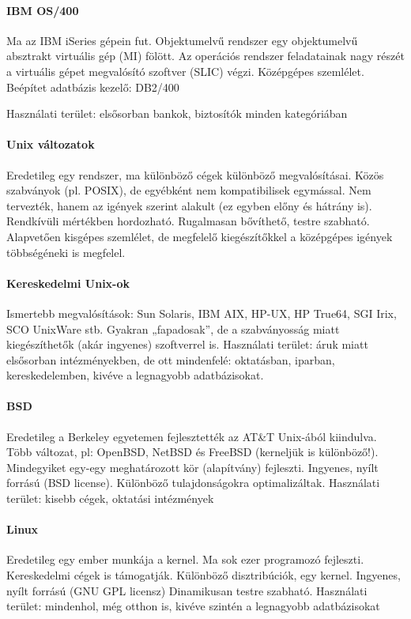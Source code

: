 \documentclass[fleqn,10pt,a4paper]{article}
\theoremstyle{magyar}
\begin{document}
  \paragraph{IBM OS/400}
  Ma az IBM iSeries gépein fut. Objektumelvű rendszer egy objektumelvű absztrakt virtuális gép (MI) fölött.
  Az operációs rendszer feladatainak nagy részét a virtuális gépet megvalósító szoftver (SLIC) végzi. Középgépes
  szemlélet. Beépítet adatbázis kezelő: DB2/400

  Használati terület: elsősorban bankok, biztosítók minden kategóriában

  \paragraph{Unix változatok} Eredetileg egy rendszer, ma különböző cégek különböző megvalósításai. Közös szabványok
  (pl. POSIX), de egyébként nem kompatibilisek egymással. Nem tervezték, hanem az igények szerint alakult (ez egyben
  előny és hátrány is). Rendkívüli mértékben hordozható. Rugalmasan bővíthető, testre szabható. Alapvetően kisgépes
  szemlélet, de megfelelő kiegészítőkkel a középgépes igények többségéneki is megfelel.

  \paragraph{Kereskedelmi Unix-ok} Ismertebb megvalósítások: Sun Solaris, IBM AIX, HP-UX, HP True64, SGI Irix, SCO
  UnixWare stb. Gyakran „fapadosak”, de a szabványosság miatt kiegészíthetők (akár ingyenes) szoftverrel is.
  Használati terület: áruk miatt elsősorban intézményekben, de ott mindenfelé: oktatásban, iparban, kereskedelemben,
  kivéve a legnagyobb adatbázisokat.

  \paragraph{BSD} Eredetileg a Berkeley egyetemen fejlesztették az AT\&T Unix-ából kiindulva. Több változat, pl:
  OpenBSD, NetBSD és FreeBSD (kerneljük is különböző!). Mindegyiket egy-egy meghatározott kör (alapítvány)
  fejleszti. Ingyenes, nyílt forrású (BSD license). Különböző tulajdonságokra optimalizáltak. Használati terület: kisebb
  cégek, oktatási intézmények

  \paragraph{Linux} Eredetileg egy ember munkája a kernel. Ma sok ezer programozó fejleszti. Kereskedelmi cégek is
  támogatják. Különböző disztribúciók, egy kernel. Ingyenes, nyílt forrású (GNU GPL licensz) 
  Dinamikusan testre szabható. Használati terület: mindenhol, még otthon is, kivéve szintén a legnagyobb adatbázisokat
\end{document}
